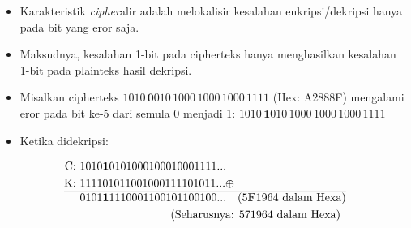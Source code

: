 \documentclass{article}
\begin{document}

\begin{itemize}
  \item Karakteristik \textit{cipher}alir adalah melokalisir kesalahan enkripsi/dekripsi hanya pada bit yang eror saja.
  \item Maksudnya, kesalahan 1-bit pada cipherteks hanya menghasilkan kesalahan 1-bit pada plainteks hasil dekripsi.
  \item Misalkan cipherteks $1010\, \mathbf{0}010\, 1000\, 1000\, 1000\, 1111$ (Hex: A2888F) mengalami eror pada bit ke-5 dari semula 0 menjadi 1: $1010\, \mathbf{1}010\, 1000\, 1000\, 1000\, 1111$
  \item Ketika didekripsi:
\end{itemize}

\vspace{5mm}

\begin{align*}
\text{C: } & 1010\mathbf{1}0101000100010001111... \\
\text{K: } & 111101011001000111101011... \oplus \\
\hline
& 0101\mathbf{1}1110001100101100100... \quad (5\mathbf{F}1964\text{ dalam Hexa}) \\
& \quad \quad \quad \quad \quad \quad \quad \quad \text{(Seharusnya: 571964 dalam Hexa)}
\end{align*}
\end{document}
